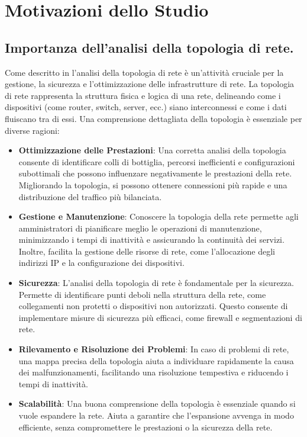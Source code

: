 \documentclass[target=bach,aauheader=,style=]{thud}
\begin{document}
\section{Motivazioni dello Studio}
\subsection{Importanza dell'analisi della topologia di rete.}
Come descritto in \cite{tanenbaum2011computer} l'analisi della topologia di rete è un'attività cruciale per la gestione, la sicurezza e l'ottimizzazione delle infrastrutture di rete. La topologia di rete rappresenta la struttura fisica e logica di una rete, delineando come i dispositivi (come router, switch, server, ecc.) siano interconnessi e come i dati fluiscano tra di essi. Una comprensione dettagliata della topologia è essenziale per diverse ragioni:
\begin{itemize}
  \item \textbf{Ottimizzazione delle Prestazioni}: Una corretta analisi della topologia consente di identificare colli di bottiglia, percorsi inefficienti e configurazioni subottimali che possono influenzare negativamente le prestazioni della rete. Migliorando la topologia, si possono ottenere connessioni più rapide e una distribuzione del traffico più bilanciata.
  \item \textbf{Gestione e Manutenzione}: Conoscere la topologia della rete permette agli amministratori di pianificare meglio le operazioni di manutenzione, minimizzando i tempi di inattività e assicurando la continuità dei servizi. Inoltre, facilita la gestione delle risorse di rete, come l'allocazione degli indirizzi IP e la configurazione dei dispositivi.
  \item \textbf{Sicurezza}: L'analisi della topologia di rete è fondamentale per la sicurezza. Permette di identificare punti deboli nella struttura della rete, come collegamenti non protetti o dispositivi non autorizzati. Questo consente di implementare misure di sicurezza più efficaci, come firewall e segmentazioni di rete.
  \item \textbf{Rilevamento e Risoluzione dei Problemi}: In caso di problemi di rete, una mappa precisa della topologia aiuta a individuare rapidamente la causa dei malfunzionamenti, facilitando una risoluzione tempestiva e riducendo i tempi di inattività.
  \item \textbf{Scalabilità}: Una buona comprensione della topologia è essenziale quando si vuole espandere la rete. Aiuta a garantire che l'espansione avvenga in modo efficiente, senza compromettere le prestazioni o la sicurezza della rete.
\end{itemize}
\end{document}
